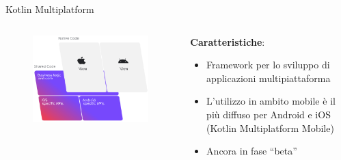 \begin{frame}{Kotlin Multiplatform}
    \begin{columns}[onlytextwidth]
        \begin{column}{0.55\textwidth}
        
             \begin{figure}[H]
                \includegraphics[width=1\textwidth]{img/kmm-stack-official.png}
            \end{figure}
            
        \end{column}
        \begin{column}{0.45\textwidth}
        
            \textbf{Caratteristiche}:
            \begin{itemize}
                \item Framework per lo sviluppo di applicazioni multipiattaforma 
                \item L'utilizzo in ambito mobile è il più diffuso per Android e iOS (Kotlin Multiplatform Mobile)
                \item Ancora in fase ``beta''
            \end{itemize}
            
        \end{column}
    \end{columns}
\end{frame}

